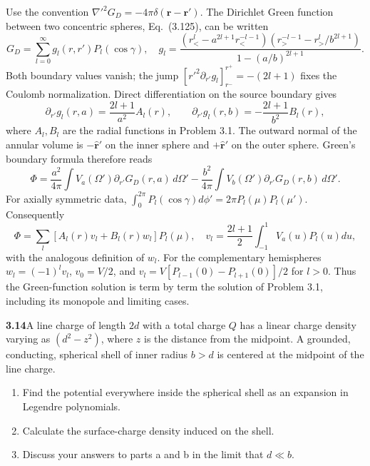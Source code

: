 Use the convention $\nabla'^2G_D=-4\pi\delta(\mathbf r-\mathbf r')$.
The Dirichlet Green function between two concentric spheres, Eq.~(3.125),
can be written
\[
G_D=\sum_{l=0}^\infty g_l(r,r')P_l(\cos\gamma),
\quad
 g_l=\frac{(r_<^l-a^{2l+1}r_<^{-l-1})
(r_>^{-l-1}-r_>^l/b^{2l+1})}{1-(a/b)^{2l+1}}.
\]
Both boundary values vanish; the jump
$[r'^2\partial_{r'}g_l]_{r^-}^{r^+}=-(2l+1)$ fixes the
Coulomb normalization.  Direct differentiation on the source
boundary gives
\[
\partial_{r'}g_l(r,a)=\frac{2l+1}{a^2}A_l(r),\qquad
\partial_{r'}g_l(r,b)=-\frac{2l+1}{b^2}B_l(r),
\]
where $A_l,B_l$ are the radial functions in Problem 3.1.
The outward normal of the annular volume is $-\hat{\mathbf r}'$
on the inner sphere and $+\hat{\mathbf r}'$ on the outer sphere.
Green's boundary formula therefore reads
\[
\Phi=\frac{a^2}{4\pi}\int V_a(\Omega')
\partial_{r'}G_D(r,a)\,d\Omega'
-\frac{b^2}{4\pi}\int V_b(\Omega')
\partial_{r'}G_D(r,b)\,d\Omega'.
\]
For axially symmetric data,
$\int_0^{2\pi}P_l(\cos\gamma)d\phi'=2\pi P_l(\mu)P_l(\mu')$.
Consequently
\[
\Phi=\sum_l[A_l(r)v_l+B_l(r)w_l]P_l(\mu),\quad
v_l=\frac{2l+1}{2}\int_{-1}^1V_a(u)P_l(u)du,
\]
with the analogous definition of $w_l$.  For the complementary
hemispheres $w_l=(-1)^lv_l$, $v_0=V/2$, and
$v_l=V[P_{l-1}(0)-P_{l+1}(0)]/2$ for $l>0$.
Thus the Green-function solution is term by term the solution of
Problem 3.1, including its monopole and limiting cases.

\par\bigskip
\noindent\textbf{3.14}\quad A line charge of length $2d$ with a total charge $Q$ has a linear charge density varying as $(d^{2}-z^{2})$, where $z$ is the distance from the midpoint. A grounded, conducting, spherical shell of inner radius $b>d$ is centered at the midpoint of the line charge.
\begin{enumerate}
\item[(a)] Find the potential everywhere inside the spherical shell as an expansion in Legendre polynomials.
\item[(b)] Calculate the surface-charge density induced on the shell.
\item[(c)] Discuss your answers to parts a and b in the limit that $d\ll b$.
\end{enumerate}
\solution

